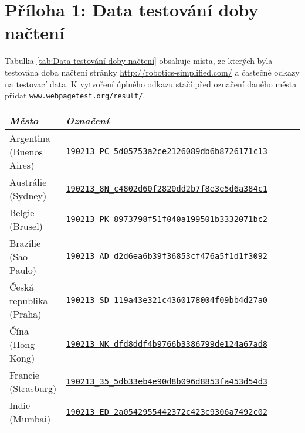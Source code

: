 \documentclass[a4paper, 12pt]{article}
\begin{document}
  \section{Příloha 1: Data testování doby načtení} \label{sec:Příloha 1: Data testování doby načtení}
  Tabulka \ref{tab:Data testování doby načtení} obsahuje místa, ze kterých byla testována doba načtení stránky \url{http://robotics-simplified.com/} a častečné odkazy na testovací data. K vytvoření úplného odkazu stačí před označení daného města přidat \texttt{www.webpagetest.org/result/}.

\begin{table}[H]
  \footnotesize
  \centering
  \begin{tabular}{*5l}
    \toprule
    \emph{Město}            & \emph{Označení}                      \\ \midrule
    Argentina (Buenos Aires)        & \href{https://www.webpagetest.org/result/190213_PC_5d05753a2ce2126089db6b8726171c13}{\texttt{190213\_PC\_5d05753a2ce2126089db6b8726171c13}} \\
    Austrálie (Sydney)              & \href{https://www.webpagetest.org/result/190213_8N_c4802d60f2820dd2b7f8e3e5d6a384c1}{\texttt{190213\_8N\_c4802d60f2820dd2b7f8e3e5d6a384c1}} \\
    Belgie (Brusel)                 & \href{https://www.webpagetest.org/result/190213_PK_8973798f51f040a199501b3332071bc2}{\texttt{190213\_PK\_8973798f51f040a199501b3332071bc2}} \\
    Brazílie (Sao Paulo)            & \href{https://www.webpagetest.org/result/190213_AD_d2d6ea6b39f36853cf476a5f1d1f3092}{\texttt{190213\_AD\_d2d6ea6b39f36853cf476a5f1d1f3092}} \\
    Česká republika (Praha)         & \href{https://www.webpagetest.org/result/190213_SD_119a43e321c4360178004f09bb4d27a0}{\texttt{190213\_SD\_119a43e321c4360178004f09bb4d27a0}} \\
    Čína (Hong Kong)                & \href{https://www.webpagetest.org/result/190213_NK_dfd8ddf4b9766b3386799de124a67ad8}{\texttt{190213\_NK\_dfd8ddf4b9766b3386799de124a67ad8}} \\
    Francie (Strasburg)             & \href{https://www.webpagetest.org/result/190213_35_5db33eb4e90d8b096d8853fa453d54d3}{\texttt{190213\_35\_5db33eb4e90d8b096d8853fa453d54d3}} \\
    Indie (Mumbai)                  & \href{https://www.webpagetest.org/result/190213_ED_2a0542955442372c423c9306a7492c02}{\texttt{190213\_ED\_2a0542955442372c423c9306a7492c02}} \\

\end{tabular}
\end{table}
\end{document}
